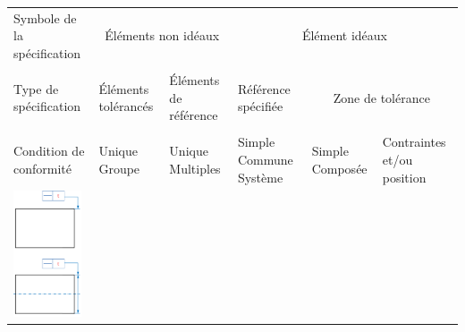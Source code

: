 \documentclass[11pt,oneside]{article}
\begin{document}
\begin{exemple}
\footnotesize{
\begin{center}
\begin{tabular}{|p{}|p{}|p{}|p{}|p{}|p{}|}
\hline
Symbole de la spécification & 
\multicolumn{2}{c|}{Éléments non idéaux} &
\multicolumn{3}{c|}{Élément idéaux} \\
&
\multicolumn{2}{c|}{} &
\multicolumn{3}{c|}{}\\
\hline
Type de spécification & 
Éléments tolérancés &
Éléments de référence & 
Référence spécifiée & 
\multicolumn{2}{c|}{Zone de tolérance} \\
&&&&
\multicolumn{2}{c|}{}\\
\hline
Condition de conformité & 
Unique Groupe & Unique Multiples &
Simple Commune Système &
Simple Composée & 
Contraintes et/ou position \\
\hline
\multirow{12}{*}{\includegraphics[width=2cm]{png/ex_rectitude}}&&&&&\\
&&&&&\\
&&&&&\\
&&&&&\\
&&&&&\\
&&&&&\\
&&&&&\\
&&&&&\\
&&&&&\\
&&&&&\\
&&&&&\\
&&&&&\\
\hline
\end{tabular}
\end{center}
}
\end{exemple}
\end{document}
